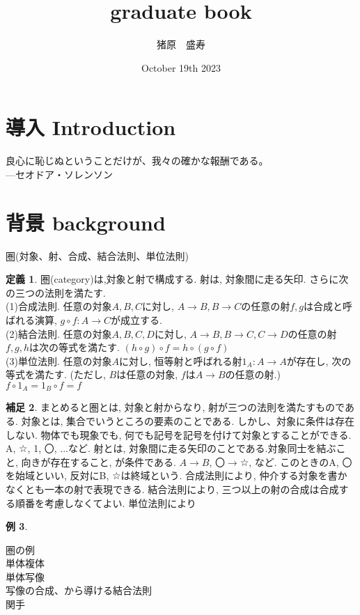 \documentclass{article}
\title{graduate book}
\author{猪原　盛寿}
\date{October 19th 2023}
\theoremstyle{definition}
\newtheorem{dfn}{定義}[section]
\newtheorem{exam}[dfn]{例}
\newtheorem{hsk}[dfn]{補足}
\begin{document}
\Large
\maketitle

\section{導入 Introduction}
良心に恥じぬということだけが、我々の確かな報酬である。\\
---セオドア・ソレンソン
\section{背景 background}
圏(対象、射、合成、結合法則、単位法則)\\
\begin{dfn}
圏(category)は,対象と射で構成する. 射は, 対象間に走る矢印. さらに次の三つの法則を満たす.\\
(1)合成法則. 任意の対象$A, B, C$に対し, $A\rightarrow B, B\rightarrow C$の任意の射$f, g$は合成と呼ばれる演算, $g \circ f: A\rightarrow C$が成立する.
\\(2)結合法則. 任意の対象$A, B, C, D$に対し, $A\rightarrow B, B\rightarrow C, C\rightarrow D$の任意の射$f, g, h$は次の等式を満たす. $(h \circ g) \circ f = h \circ (g \circ f)$  
\\(3)単位法則. 任意の対象$A$に対し, 恒等射と呼ばれる射$1_A:A\rightarrow A$が存在し, 次の等式を満たす. (ただし, $B$は任意の対象, $f$は$A\rightarrow B$の任意の射.) 
$f\circ 1_A = 1_B\circ f = f$  
\end{dfn}
\begin{hsk}
まとめると圏とは, 対象と射からなり, 射が三つの法則を満たすものである.
対象とは, 集合でいうところの要素のことである. しかし、対象に条件は存在しない. 物体でも現象でも, 何でも記号を記号を付けて対象とすることができる. A, ☆, 1, 〇, ...など. 
射とは, 対象間に走る矢印のことである.対象同士を結ぶこと, 向きが存在すること, が条件である. $A \rightarrow B$, 〇$\rightarrow$☆, など. このときのA, 〇を始域といい, 反対にB, ☆は終域という.
合成法則により, 仲介する対象を書かなくとも一本の射で表現できる. 結合法則により, 三つ以上の射の合成は合成する順番を考慮しなくてよい. 単位法則により\\
\end{hsk}
\begin{exam}

\end{exam}
圏の例\\
単体複体\\
単体写像\\
写像の合成、から導ける結合法則\\
関手\\
\end{document}
